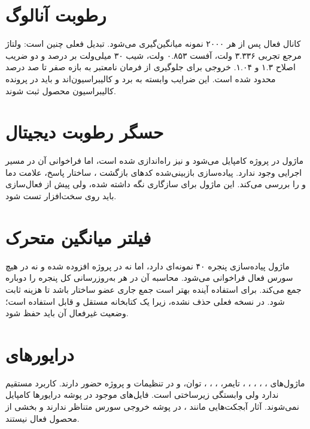 \section{رطوبت آنالوگ}
کانال فعال  پس از هر ۲۰۰۰ نمونه میانگین‌گیری می‌شود. تبدیل فعلی چنین است: ولتاژ مرجع تجربی ۳.۳۳۶ ولت، آفست ۰.۸۵۳ ولت، شیب ۳۰ میلی‌ولت بر درصد و دو ضریب اصلاح ۱.۳ و ۱.۰۴. خروجی برای جلوگیری از فرمان نامعتبر به بازه صفر تا صد درصد محدود شده است. این ضرایب وابسته به برد و کالیبراسیون‌اند و باید در پرونده کالیبراسیون محصول ثبت شوند.

\section{حسگر رطوبت دیجیتال}
ماژول
در پروژه  کامپایل می‌شود و
نیز راه‌اندازی شده است، اما فراخوانی آن در مسیر اجرایی وجود ندارد. پیاده‌سازی بازبینی‌شده کدهای بازگشت
، ساختار پاسخ، علامت دما و
را بررسی می‌کند. این ماژول برای سازگاری نگه داشته شده، ولی پیش از فعال‌سازی باید روی سخت‌افزار تست شود.

\section{فیلتر میانگین متحرک}
ماژول
پیاده‌سازی پنجره ۴۰ نمونه‌ای دارد، اما نه در پروژه  افزوده شده و نه در هیچ سورس فعال فراخوانی می‌شود. محاسبه آن در هر به‌روزرسانی کل پنجره را دوباره جمع می‌کند. برای استفاده آینده بهتر است جمع جاری عضو ساختار باشد تا هزینه ثابت شود. در نسخه فعلی حذف نشده، زیرا یک کتابخانه مستقل و قابل استفاده است؛ وضعیت غیرفعال آن باید حفظ شود.

\section{درایورهای }
ماژول‌های ، ، ، ، ، تایمر، ، ، ، توان،  و  در تنظیمات و پروژه  حضور دارند.  کاربرد مستقیم ندارد ولی وابستگی زیرساختی  است. فایل‌های  موجود در پوشه درایورها کامپایل نمی‌شوند. آثار آبجکت‌هایی مانند
،
در پوشه خروجی  سورس متناظر ندارند و بخشی از محصول فعال نیستند.
